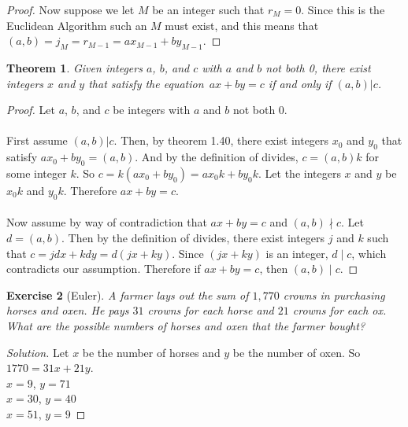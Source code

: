 \documentclass[12pt,leqno]{article}
\numberwithin{equation}{section}
\newtheorem{thm}{Theorem}[section]
\newtheorem{exer}[thm]{Exercise}
\theoremstyle{definition}
\begin{document}
\begin{proof}[Proof]
Now suppose we let $M$ be an integer such that $r_M = 0$.  Since this is the Euclidean Algorithm such an $M$ must exist, and this means that $(a, b) = j_M = r_{M-1} = ax_{M-1} + by_{M-1}$.
\end{proof}



\setcounter{thm}{47}

\begin{thm}
Given integers $a$, $b$, and $c$ with $a$ and $b$ not both 0, there
exist integers $x$ and $y$ that satisfy the equation~$ax + by = c$
if and only if $(a, b)|c$.
\end{thm}

\begin{proof}[Proof]
Let $a$, $b$, and $c$ be integers with $a$ and $b$ not both 0.\\ \\
First assume $(a, b)|c$.  Then, by theorem 1.40, there exist integers $x_0$ and $y_0$ that satisfy $ax_0 + by_0 = (a, b)$.  And by the definition of divides, $c = (a, b)k$ for some integer $k$.  So $c = k(ax_0 + by_0) = ax_0k + by_0k$.  Let the integers $x$ and $y$ be $x_0k$ and $y_0k$.  Therefore $ax + by = c$.\\ \\
Now assume by way of contradiction that $ax + by = c$ and $(a, b) \nmid c$.  Let $d = (a, b)$.  Then by the definition of divides, there exist integers $j$ and $k$ such that $c = jdx + kdy = d(jx + ky)$.  Since $(jx + ky)$ is an integer, $d \mid c$, which contradicts our assumption.  Therefore if $ax + by = c$, then $(a, b) \mid c$.
\end{proof}

\setcounter{thm}{49}

\begin{exer}[Euler]
A farmer lays out the sum of $1,770$ crowns in purchasing horses and
oxen.  He pays $31$ crowns for each horse and $21$ crowns for each
ox.  What are the possible numbers of horses and oxen that the
farmer bought?
\end{exer}

\begin{proof}[Solution]
Let $x$ be the number of horses and $y$ be the number of oxen.  So $1770 = 31x + 21y$.\\
$x = 9$, $y = 71$\\
$x = 30$, $y = 40$\\
$x = 51$, $y = 9$
\end{proof}
\end{document}

